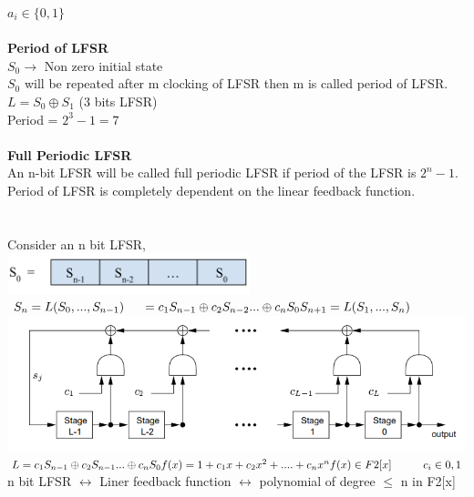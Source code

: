 \documentclass[11pt]{article}
\begin{document}
$a_{i} \in \{0,1\}$ \\\\
\textbf{Period of LFSR} \\
$S_{0} \rightarrow$ Non zero initial state \\
$S_{0}$ will be repeated after m clocking of LFSR then m is called period of LFSR. \\
$L = S_{0} \oplus S_{1}$ \hspace*{1cm}(3 bits LFSR) \\
Period = $2^{3} - 1 = 7$\\\\
\textbf{Full Periodic LFSR} \\
An n-bit LFSR will be called full periodic LFSR if period of the LFSR is $2^{n}-1$. \\
Period of LFSR is completely dependent on the linear feedback function. \\\\\\
Consider an n bit LFSR,\\
\includegraphics[width=200pt]{p1.png} \\
$S_{n} = L(S_{0},...,S_{n-1}) \\
\hspace*{0.5cm} = c_{1}S_{n-1} \oplus c_{2}S_{n-2} ... \oplus c_{n}S_{0}\\\\
S_{n+1} = L(S_{1},...,S_{n})\\$
\includegraphics[width=400pt]{p5.png} \\
$L = c_{1}S_{n-1} \oplus c_{2}S_{n-1}... \oplus c_{n}S_{0}\\
f(x) = 1 + c_{1}x + c_{2}x^{2} +....+ c_{n}x^{n}\\
f(x) \in F2[x] \hspace{1cm} c_{i} \in {0,1}\\\\ $
n bit LFSR $\longleftrightarrow$ Liner feedback function $\longleftrightarrow$ polynomial of degree $\leq$ n in F2[x]\\\\
\end{document}
